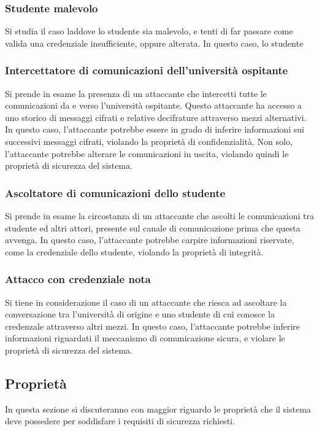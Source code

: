 \documentclass[a4paper,12pt]{article}
\begin{document}
\subsubsection{Studente malevolo}
Si studia il caso laddove lo studente sia malevolo, e tenti di far passare come valida una credenziale insufficiente, oppure alterata. In questo caso, lo studente 
\subsubsection{Intercettatore di comunicazioni dell'università ospitante}
Si prende in esame la presenza di un attaccante che intercetti tutte le comunicazioni da e verso l'università ospitante. Questo attaccante ha accesso a uno storico di messaggi cifrati e relative decifrature attraverso mezzi alternativi. 
\newline In questo caso, l'attaccante potrebbe essere in grado di inferire informazioni sui successivi messaggi cifrati, violando la proprietà di confidenzialità. Non solo, l'attaccante potrebbe alterare le comunicazioni in uscita, violando quindi le proprietà di sicurezza del sistema.
\subsubsection{Ascoltatore di comunicazioni dello studente}
Si prende in esame la circostanza di un attaccante che ascolti le comunicazioni tra studente ed altri attori, presente sul canale di comunicazione prima che questa avvenga. In questo caso, l'attaccante potrebbe carpire informazioni riservate, come la credenziale dello studente, violando la proprietà di integrità.
\subsubsection{Attacco con credenziale nota}
Si tiene in considerazione il caso di un attaccante che riesca ad ascoltare la conversazione tra l'università di origine e uno studente di cui conosce la credenzale attraverso altri mezzi.
\newline In questo caso, l'attaccante potrebbe inferire informazioni riguardati il meccanismo di comunicazione sicura, e violare le proprietà di sicurezza del sistema. 

\subsection{Proprietà}
In questa sezione si discuteranno con maggior riguardo le proprietà che il sistema deve possedere per soddisfare i requisiti di sicurezza richiesti.
\end{document}
